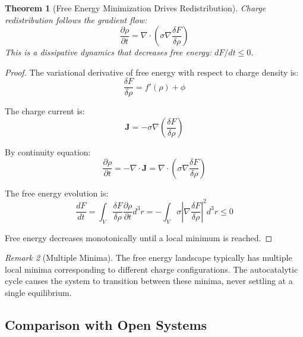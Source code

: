 \documentclass[12pt,a4paper]{article}
\theoremstyle{plain}
\newtheorem{theorem}{Theorem}[section]
\theoremstyle{definition}
\theoremstyle{remark}
\newtheorem{remark}[theorem]{Remark}
\begin{document}
\begin{theorem}[Free Energy Minimization Drives Redistribution]
\label{thm:free_energy_min}
Charge redistribution follows the gradient flow:
\begin{equation}
\frac{\partial \rho}{\partial t} = \nabla \cdot \left( \sigma \nabla \frac{\delta F}{\delta \rho} \right)
\end{equation}
This is a dissipative dynamics that decreases free energy: $dF/dt \leq 0$.
\end{theorem}

\begin{proof}
The variational derivative of free energy with respect to charge density is:
\begin{equation}
\frac{\delta F}{\delta \rho} = f'(\rho) + \phi
\end{equation}

The charge current is:
\begin{equation}
\mathbf{J} = -\sigma \nabla \left( \frac{\delta F}{\delta \rho} \right)
\end{equation}

By continuity equation:
\begin{equation}
\frac{\partial \rho}{\partial t} = -\nabla \cdot \mathbf{J} = \nabla \cdot \left( \sigma \nabla \frac{\delta F}{\delta \rho} \right)
\end{equation}

The free energy evolution is:
\begin{equation}
\frac{dF}{dt} = \int_V \frac{\delta F}{\delta \rho} \frac{\partial \rho}{\partial t} d^3r = -\int_V \sigma \left| \nabla \frac{\delta F}{\delta \rho} \right|^2 d^3r \leq 0
\end{equation}

Free energy decreases monotonically until a local minimum is reached.
\end{proof}

\begin{remark}[Multiple Minima]
The free energy landscape typically has multiple local minima corresponding to different charge configurations. The autocatalytic cycle causes the system to transition between these minima, never settling at a single equilibrium.
\end{remark}

\subsection{Comparison with Open Systems}
\end{document}
